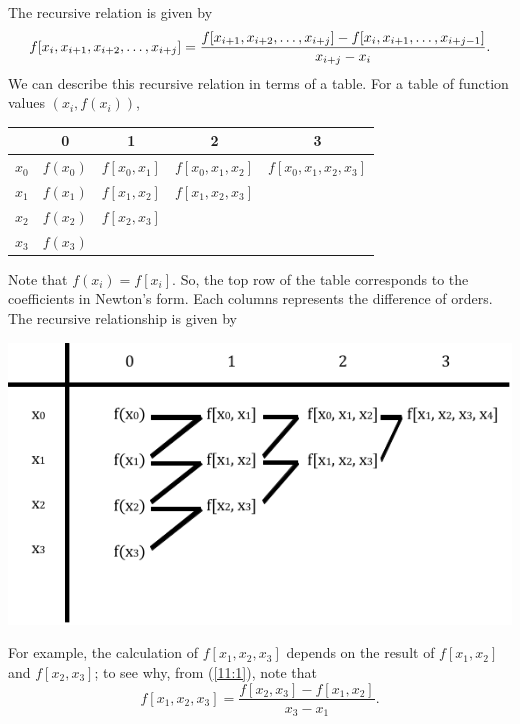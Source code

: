 \documentclass[letterpaper]{article}
\begin{document}
The recursive relation is given by 
\begin{equation}{\label{11:1}}
    f[x_i, x_{i + 1}, x_{i + 2}, \hdots, x_{i + j}] = \frac{f[x_{i + 1}, x_{i + 2}, \hdots, x_{i + j}] - f[x_i, x_{i + 1}, \hdots, x_{i + j - 1}]}{x_{i + j} - x_{i}}.
\end{equation}
We can describe this recursive relation in terms of a table. For a table of function values $(x_i, f(x_i))$, 
\begin{center}
    \begin{tabular}{c|c|c|c|c}
              & 0        & 1             & 2                  & 3 \\ 
            \hline 
        $x_0$ & $f(x_0)$ & $f[x_0, x_1]$ & $f[x_0, x_1, x_2]$ & $f[x_0, x_1, x_2, x_3]$ \\ 
        $x_1$ & $f(x_1)$ & $f[x_1, x_2]$ & $f[x_1, x_2, x_3]$ & \\ 
        $x_2$ & $f(x_2)$ & $f[x_2, x_3]$ &                    & \\ 
        $x_3$ & $f(x_3)$ &               &                    & \\ 
    \end{tabular}
\end{center}
Note that $f(x_i) = f[x_i]$. So, the top row of the table corresponds to the coefficients in Newton's form. Each columns represents the difference of orders. The recursive relationship is given by 
\begin{center}
    \includegraphics[scale=0.6]{../assets/divided_diff_functions.png}
\end{center}
For example, the calculation of $f[x_1, x_2, x_3]$ depends on the result of $f[x_1, x_2]$ and $f[x_2, x_3]$; to see why, from (\ref{11:1}), note that 
\[f[x_1, x_2, x_3] = \frac{f[x_2, x_3] - f[x_1, x_2]}{x_3 - x_1}.\]
\end{document}
